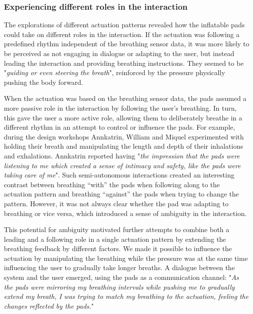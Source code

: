 \subsubsection{Experiencing different roles in the interaction}

The explorations of different actuation patterns revealed how the inflatable pads could take on different roles in the interaction. If the actuation was following a predefined rhythm independent of the breathing sensor data, it was more likely to be perceived as not engaging in dialogue or adapting to the user, but instead leading the interaction and providing breathing instructions. They seemed to be "\textit{guiding or even steering the breath}", reinforced by the pressure physically pushing the body forward.

When the actuation was based on the breathing sensor data, the pads assumed a more passive role in the interaction by following the user’s breathing. In turn, this gave the user a more active role, allowing them to deliberately breathe in a different rhythm in an attempt to control or influence the pads. For example, during the design workshops Annkatrin, William and Miquel experimented with holding their breath and manipulating the length and depth of their inhalations and exhalations. Annkatrin reported having "\textit{the impression that the pads were listening to me which created a sense of intimacy and safety, like the pads were taking care of me}". Such semi-autonomous interactions created an interesting contrast between breathing “with” the pads when following along to the actuation pattern and breathing “against” the pads when trying to change the pattern. However, it was not always clear whether the pad was adapting to breathing or vice versa, which introduced a sense of ambiguity in the interaction.

This potential for ambiguity motivated further attempts to combine both a leading and a following role in a single actuation pattern by extending the breathing feedback by different factors. We made it possible to influence the actuation by manipulating the breathing while the pressure was at the same time influencing the user to gradually take longer breaths. A dialogue between the system and the user emerged, using the pads as a communication channel: "\textit{As the pads were mirroring my breathing intervals while pushing me to gradually extend my breath, I was trying to match my breathing to the actuation, feeling the changes reflected by the pads.}"


